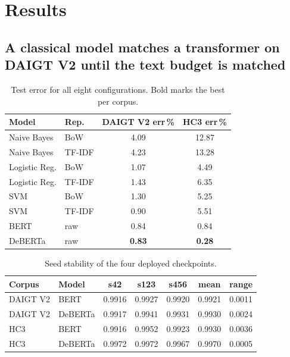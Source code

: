 \section{Results}
\label{sec:results}

\subsection{A classical model matches a transformer on DAIGT V2 until the text budget is matched}

\begin{table}[!t]
\centering
\caption{Test error for all eight configurations. Bold marks the best per corpus.}
\label{tab:models}
\footnotesize
\setlength{\tabcolsep}{4pt}
\begin{tabular}{@{}llcc@{}}
\toprule
Model & Rep. & DAIGT V2 err\,\% & HC3 err\,\% \\
\midrule
Naive Bayes & BoW & 4.09 & 12.87 \\
Naive Bayes & TF-IDF & 4.23 & 13.28 \\
Logistic Reg. & BoW & 1.07 & 4.49 \\
Logistic Reg. & TF-IDF & 1.43 & 6.35 \\
SVM & BoW & 1.30 & 5.25 \\
SVM & TF-IDF & 0.90 & 5.51 \\
BERT & raw & 0.84 & 0.84 \\
DeBERTa & raw & \textbf{0.83} & \textbf{0.28} \\
\bottomrule
\end{tabular}
\end{table}

\begin{table}[!t]
\centering
\caption{Seed stability of the four deployed checkpoints.}
\label{tab:seeds}
\footnotesize
\setlength{\tabcolsep}{4pt}
\begin{tabular}{@{}llccccc@{}}
\toprule
Corpus & Model & s42 & s123 & s456 & mean & range \\
\midrule
DAIGT V2 & BERT & 0.9916 & 0.9927 & 0.9920 & 0.9921 & 0.0011 \\
DAIGT V2 & DeBERTa & 0.9917 & 0.9941 & 0.9931 & 0.9930 & 0.0024 \\
HC3 & BERT & 0.9916 & 0.9952 & 0.9923 & 0.9930 & 0.0036 \\
HC3 & DeBERTa & 0.9972 & 0.9972 & 0.9967 & 0.9970 & 0.0005 \\
\bottomrule
\end{tabular}
\end{table}

